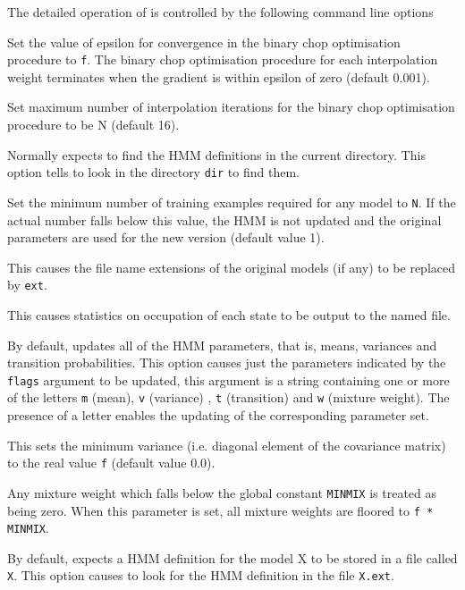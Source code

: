 The detailed operation of  is controlled by the following
command line options
\begin{optlist}
    Set the value of epsilon for convergence 
      in the binary chop  optimisation procedure to {\tt f}.
       The binary chop  optimisation procedure for each
       interpolation weight terminates when the gradient is
       within epsilon of zero (default 0.001).
  
    Set maximum number of interpolation iterations
       for the binary chop  optimisation procedure to be N
       (default 16).

 Normally  expects to find the HMM definitions
      in the current directory.  This option tells  to look in
      the directory {\tt dir} to find them.


     Set the minimum number of training examples 
    required for any model to {\tt N}.  If the actual number
    falls below this value, the HMM is not updated and the original
    parameters are used for the new version (default value 1).

    This causes the file name extensions of the
      original models (if any) to be replaced by {\tt ext}.

   This causes statistics on occupation of each
      state to be output to the named file.  
      
   By default,  updates all of the HMM parameters,
      that is, means, variances and transition probabilities. This 
      option causes just the parameters indicated by the {\tt flags}
      argument to be updated, this argument is a string containing one
      or more of the letters {\tt m} (mean), {\tt v} (variance) ,
      {\tt t} (transition) and {\tt w} (mixture weight).  The 
      presence of a letter enables
      the updating of the corresponding parameter set.

    This sets the minimum variance (i.e. diagonal element of
      the covariance matrix) to the real value {\tt f} (default value
      0.0).
  
    Any mixture weight which falls below the global
            constant {\tt MINMIX} is treated as being zero.
      When this parameter is  set,  all mixture weights  are floored
      to {\tt f * MINMIX}.
     
    By default,  expects a HMM definition for 
      the model X to be stored in a file called {\tt X}.  This
      option causes  to look for the HMM definition in the
      file {\tt X.ext}.

\stdoptB
\stdoptH
\stdoptM

\end{optlist}

